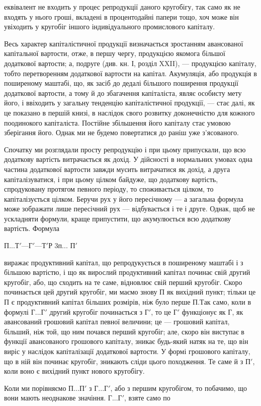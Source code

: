 \parcont{}  %
еквівалент не входить у процес репродукції даного кругобігу, так само
як не входять у нього гроші, вкладені в процентодайні папери тощо, хоч
може він увіходить у кругобіг іншого індивідуального промислового
капіталу.

Весь характер капіталістичної продукції визначається зростанням
авансованої капітальної вартости, отже, в першу чергу, продукцією якомога
більшої додаткової вартости; а, подруге (див. кн. І, розділ XXII),
— продукцією капіталу, тобто перетворенням додаткової вартости на
капітал. Акумуляція, або продукція в поширеному маштабі, що, як
засіб до дедалі більшого поширення продукції додаткової вартости, а тому
й до збагачення капіталіста, являє особисту мету його, і ввіходить у
загальну тенденцію капіталістичної продукції, — стає далі, як це
показано в першій книзі, в наслідок свого розвитку доконечністю
для кожного поодинокого капіталіста. Постійне збільшення його капіталу
стає умовою зберігання його. Однак ми не будемо повертатися до раніш
уже з’ясованого.

Спочатку ми розглядали просту репродукцію і при цьому припускали,
що всю додаткову вартість витрачається як дохід. У дійсності в нормальних
умовах одна частина додаткової вартости завжди мусить витрачатися як
дохід, а друга капіталізуватися, і при цьому цілком байдуже, що додаткову
вартість, спродуковану протягом певного періоду, то споживається
цілком, то капіталізується цілком. Беручи рух у його пересічному — а
загальна формула може зображати лише пересічний рух — відбувається
і те і друге. Однак, щоб не ускладняти формули, краще припустити,
що акумулюється всю додаткову вартість. Формула

$П... Т' — Г' — Т' Р$ 3п... $П'$

виражає продуктивний капітал, що репродукується в поширеному маштабі
і з більшою вартістю, і що як вирослий продуктивний капітал починає
свій другий кругобіг, або, що сходить на те саме, відновлює свій
перший кругобіг. Скоро починається цей другий кругобіг, ми маємо
знову П як вихідний пункт; тільки це П є продуктивний капітал
більших розмірів, ніж було перше $П. Т$ак само, коли в формулі $Г... Г'$
другий кругобіг починається з $Г'$, то це $Г'$ функціонує як Г, як авансований
грошовий капітал певної величини; це — грошовий капітал, більший,
ніж той, що ним почався перший кругобіг; але, скоро він виступає
в функції авансованого грошового капіталу, зникає будь-який натяк на
те, що він виріс у наслідок капіталізації додаткової вартости. У формі
грошового капіталу, що в ній він починає кругобіг, зникають сліди цього
походження. Те саме й з $П'$, коли воно є вихідний пункт нового
кругобігу.

Коли ми порівняємо $П... П'$ з $Г... Г'$, або з першим кругобігом, то
побачимо, що вони мають неоднакове значіння. $Г... Г'$, взяте само по
\parbreak{}  %
